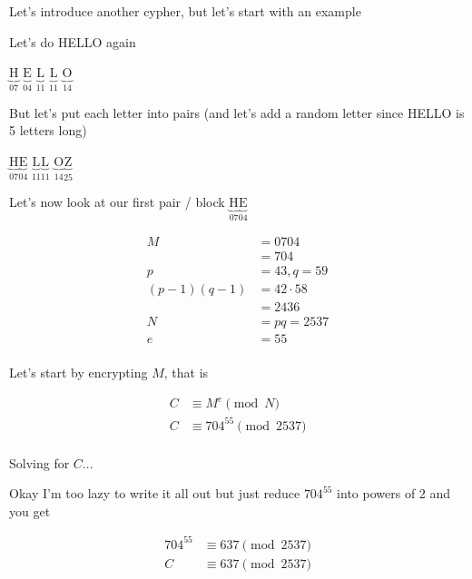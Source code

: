 \documentclass[../../Main.tex]{subfiles}
\begin{document}
Let's introduce another cypher, but let's start with an example

\begin{example}

    Let's do HELLO again

    \begin{center}
        $\underbrace{\text{H}}_{07}$ $\underbrace{\text{E}}_{04}$ $\underbrace{\text{L}}_{11}$ $\underbrace{\text{L}}_{11}$ $\underbrace{\text{O}}_{14}$ 
    \end{center}

    But let's put each letter into pairs (and let's add a random letter since HELLO is 5 letters long)

    \begin{center}
        $\boxed{\underbrace{\text{H}}_{07} \underbrace{\text{E}}_{04}}$ 
        $\boxed{\underbrace{\text{L}}_{11} \underbrace{\text{L}}_{11}}$ 
        $\boxed{\underbrace{\text{O}}_{14} \underbrace{\text{Z}}_{25}}$ 
    \end{center}

    Let's now look at our first pair / block $\boxed{\underbrace{\text{H}}_{07} \underbrace{\text{E}}_{04}}$ 

    \begin{align*}
        M &= 0704 \\
        &= 704 \\
        p &= 43, q = 59 \\
        (p - 1)(q - 1) &= 42 \cdot 58 \\
        &= 2436 \\
        N &= pq = 2537 \\
        e &= 55 \\
    \end{align*}

    Let's start by encrypting $M$, that is

    \begin{align*}
        C &\equiv M^e \pmod{N} \\
        C &\equiv 704^{55} \pmod{2537} \\
    \end{align*}

    Solving for $C$...
    
    Okay I'm too lazy to write it all out but just reduce $704^{55}$ into powers of 2 and you get

    \begin{align*}
        704^{55} &\equiv 637 \pmod{2537} \\
        C &\equiv \boxed{637} \pmod{2537} \\
    \end{align*}
    

\end{example}
\end{document}
